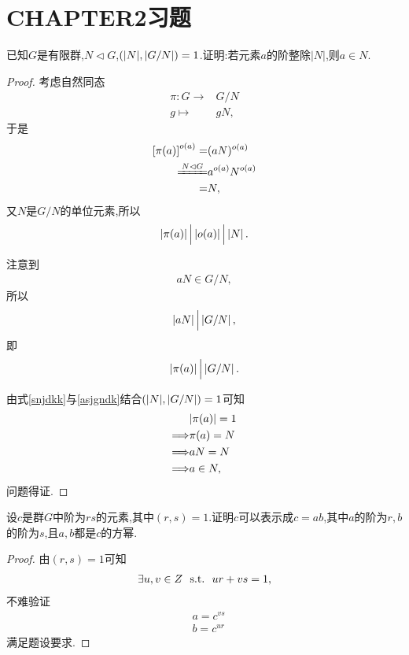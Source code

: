 \section{CHAPTER2习题}
\begin{problem}[P97T1]
    已知$G$是有限群,$N\lhd G$,$\left(|N|,|G/N|\right)=1$.证明:若元素$a$的阶整除$|N|$,则$a\in N$.
\end{problem}
\begin{proof}
    考虑自然同态\begin{align*}
        \pi:G\to&G/N\\
        g\mapsto&gN,
    \end{align*}于是\begin{align*}
        \l[\pi(a)\r]^{o(a)}=&(aN)^{o(a)}\\
        \xlongequal[]{N\lhd G}&a^{o(a)}N^{o(a)}\\
        =&N,
    \end{align*}又$N$是$G/N$的单位元素,所以\begin{align}\label{snjdkk}
        \left|\pi(a)\right|\Big|\left|o(a)\right|\Big|\left|N\right|.
    \end{align}

    注意到\begin{align*}
        aN\in G/N,
    \end{align*}所以\begin{align*}
        \left|aN\right|\Big|\left|G/N\right|,
    \end{align*}即\begin{align}\label{asjgndk}
        \left|\pi(a)\right|\Big|\left|G/N\right|.
    \end{align}

    由式\eqref{snjdkk}与\eqref{asjgndk}结合$\left(|N|,|G/N|\right)=1$可知\begin{align*}
        &|\pi(a)|=1\\
        \Longrightarrow&\pi(a)=N\\
        \Longrightarrow&aN=N\\
        \Longrightarrow&a\in N,
    \end{align*}问题得证.
\end{proof}
\begin{problem}[P97T2]
    设$c$是群$G$中阶为$rs$的元素,其中$(r,s)=1$.证明$c$可以表示成$c=ab$,其中$a$的阶为$r,b$的阶为$s$,且$a,b$都是$c$的方幂.
\end{problem}
\begin{proof}
    由$(r,s)=1$可知\begin{align*}
        \exists u,v\in\relax{Z}\ \ \mathrm{s.t.}\ \  ur+vs=1,
    \end{align*}不难验证\begin{align*}
        &a=c^{vs}\\
        &b=c^{ur}
    \end{align*}满足题设要求.
\end{proof}
